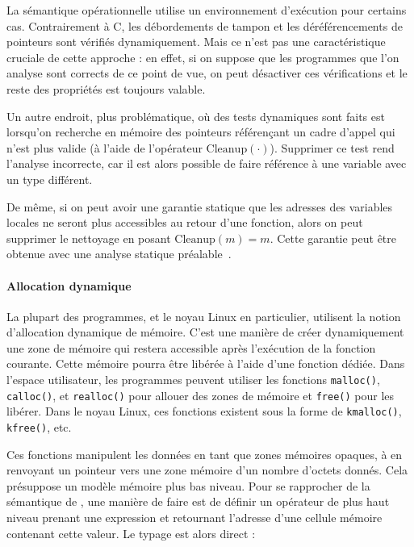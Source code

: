 La sémantique opérationnelle utilise un environnement d'exécution pour certains
cas. Contrairement à C, les débordements de tampon et les déréférencements de
pointeurs sont vérifiés dynamiquement. Mais ce n'est pas une caractéristique
cruciale de cette approche : en effet, si on suppose que les programmes que l'on
analyse sont corrects de ce point de vue, on peut désactiver ces vérifications
et le reste des propriétés est toujours valable.

Un autre endroit, plus problématique, où des tests dynamiques sont faits est
lorsqu'on recherche en mémoire des pointeurs référençant un cadre d'appel qui
n'est plus valide (à l'aide de l'opérateur $\mathrm{Cleanup}(\cdot)$). Supprimer
ce test rend l'analyse incorrecte, car il est alors possible de faire référence
à une variable avec un type différent.

De même, si on peut avoir une garantie statique que les adresses des variables
locales ne seront plus accessibles au retour d'une fonction, alors on peut
supprimer le nettoyage en posant $\mathrm{Cleanup}(m) = m$. Cette garantie peut
être obtenue avec une analyse statique préalable~\cite{ifm10}.

\paragraph{Allocation dynamique}

La plupart des programmes, et le noyau Linux en particulier, utilisent la notion
d'allocation dynamique de mémoire. C'est une manière de créer dynamiquement une
zone de mémoire qui restera accessible après l'exécution de la fonction
courante. Cette mémoire pourra être libérée à l'aide d'une fonction dédiée. Dans
l'espace utilisateur, les programmes peuvent utiliser les fonctions
\texttt{malloc()}, \texttt{calloc()}, et \texttt{realloc()} pour allouer des
zones de mémoire et \texttt{free()} pour les libérer. Dans le noyau Linux, ces
fonctions existent sous la forme de \texttt{kmalloc()}, \texttt{kfree()}, etc.


Ces fonctions manipulent les données en tant que zones mémoires opaques, à
en renvoyant un pointeur vers une zone mémoire d'un nombre d'octets donnés.
Cela présuppose un modèle mémoire plus bas niveau. Pour se rapprocher de la
sémantique de \langname, une manière de faire est de définir un opérateur de
plus haut niveau prenant une expression et retournant l'adresse d'une cellule
mémoire contenant cette valeur. Le typage est alors direct :

